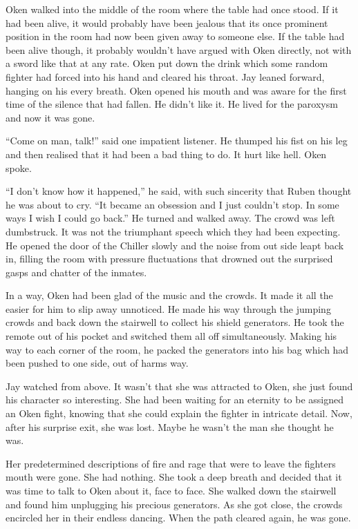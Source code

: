 Oken walked into the middle of the room where the table had once stood. If it had been alive, it would probably have been jealous that its once prominent position in the room had now been given away to someone else. If the table had been alive though, it probably wouldn't have argued with Oken directly, not with a sword like that at any rate. Oken put down the drink which some random fighter had forced into his hand and cleared his throat. Jay leaned forward, hanging on his every breath. Oken opened his mouth and was aware for the first time of the silence that had fallen. He didn't like it. He lived for the paroxysm and now it was gone.

``Come on man, talk!'' said one impatient listener. He thumped his fist on his leg and then realised that it had been a bad thing to do. It hurt like hell. Oken spoke.

``I don't know how it happened,'' he said, with such sincerity that Ruben thought he was about to cry. ``It became an obsession and I just couldn't stop. In some ways I wish I could go back.'' He turned and walked away. The crowd was left dumbstruck. It was not the triumphant speech which they had been expecting. He opened the door of the Chiller slowly and the noise from out side leapt back in, filling the room with pressure fluctuations that drowned out the surprised gasps and chatter of the inmates.

In a way, Oken had been glad of the music and the crowds. It made it all the easier for him to slip away unnoticed. He made his way through the jumping crowds and back down the stairwell to collect his shield generators. He took the remote out of his pocket and switched them all off simultaneously. Making his way to each corner of the room, he packed the generators into his bag which had been pushed to one side, out of harms way.

Jay watched from above. It wasn't that she was attracted to Oken, she just found his character so interesting. She had been waiting for an eternity to be assigned an Oken fight, knowing that she could explain the fighter in intricate detail. Now, after his surprise exit, she was lost. Maybe he wasn't the man she thought he was.

Her predetermined descriptions of fire and rage that were to leave the fighters mouth were gone. She had nothing. She took a deep breath and decided that it was time to talk to Oken about it, face to face. She walked down the stairwell and found him unplugging his precious generators. As she got close, the crowds encircled her in their endless dancing. When the path cleared again, he was gone.

